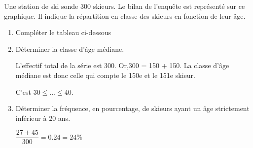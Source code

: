 \begin{corrige}
    Une station de ski sonde 300 skieurs. Le bilan de l'enquête est représenté sur ce graphique. Il indique la répartition en classe des skieurs en fonction de leur âge.

    \begin{enumerate}
        \item Compléter le tableau ci-dessous
        
        \hspace*{-5mm}

        \hspace*{-5mm}

        \hspace*{-5mm}

        \item Déterminer la classe d'âge médiane.
        
        L’effectif total de la série est 300. Or,300 = 150 + 150. La classe d'âge médiane est donc celle qui compte le 150e et le 151e skieur.

        C'est $30\leq ... \leq 40$.
        \item Déterminer la fréquence, en pourcentage, de skieurs ayant un âge strictement inférieur à 20 ans.
        
        $\dfrac{27+45}{300}=\num{0.24}=24 \%$
    \end{enumerate}
    

\end{corrige}

